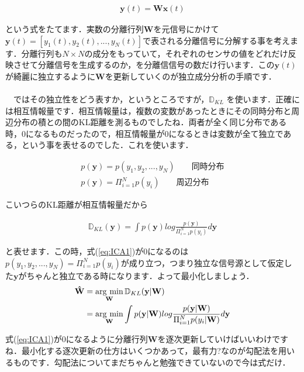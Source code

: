 \documentclass[11pt,a4paper,uplatex]{ujreport}
\newcommand{\argmin}{\mathop{\rm arg~min}\limits}
\begin{document}
\begin{eqnarray}
\mathbf{y}(t) = \mathbf{W} \mathbf{x}(t)
\end{eqnarray}

という式をたてます．実数の分離行列$\mathbf{W}$を元信号にかけて$\mathbf{y}(t) = [y_1(t), y_2(t),...,y_N(t)]$で表される分離信号に分解する事を考えます．分離行列も$N\times N$の成分をもっていて，それぞれのセンサの値をどれだけ反映させて分離信号を生成するのか，を分離信信号の数だけ行います．この$\mathbf{y}(t)$が綺麗に独立するように$\mathbf{W}$を更新していくのが独立成分分析の手順です．\\
\\
　ではその独立性をどう表すか，というところですが，$\mathbb{D}_{KL}$ を使います．正確には相互情報量です．相互情報量は，複数の変数があったときにその同時分布と周辺分布の積との間のKL距離を測るものでしたね．両者が全く同じ分布である時，0になるものだったので，相互情報量が0になるときは変数が全て独立である，という事を表せるのでした．これを使います．

\begin{eqnarray}
p (\mathbf{y}) = p(y_1, y_2,...,y_N) \qquad \text{同時分布}\\
p (\mathbf{y}) = \Pi_{i=1}^N p(y_i) \qquad \text{周辺分布}
\end{eqnarray}

こいつらのKL距離が相互情報量だから

\begin{eqnarray}
\label{eq:ICA1}
\mathbb{D}_{KL}(\mathbf{y}) = \int p(\mathbf{y}) log \frac{p(\mathbf{y})}{\Pi_{i=1}^N p(y_i)} d\mathbf{y}
\end{eqnarray}

と表せます．この時，式(\ref{eq:ICA1})が0になるのは$p(y_1, y_2,...,y_N) =\Pi_{i=1}^N p(y_i) $が成り立つ，つまり独立な信号源として仮定した$\mathbf{y}$がちゃんと独立である時になります．よって最小化しましょう．\\

\begin{align}
\label{eq:ICA2}
\mathbf{\hat W} &= \argmin_{\mathbf{W}} \mathbb{D}_{KL}(\mathbf{y}|\mathbf{W}) \nonumber \\
&= \argmin_{\mathbf{W}} \int p(\mathbf{y}|\mathbf{W}) log \frac{p(\mathbf{y}|\mathbf{W})}{\Pi_{i=1}^N p(y_i|\mathbf{W})} d\mathbf{y}
\end{align}

式(\ref{eq:ICA1})が0になるように分離行列$\mathbf{W}$を逐次更新していけばいいわけですね．最小化する逐次更新の仕方はいくつかあって，最有力?なのが勾配法を用いるものです．勾配法についてまだちゃんと勉強できていないので今は式だけ．
\end{document}
